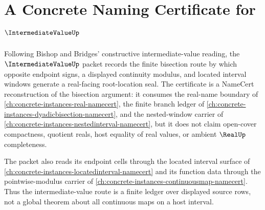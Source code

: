 \chapter{A Concrete Naming Certificate for $\IntermediateValueUp$}
\label{ch:concrete-instances-intermediatevalue-namecert}

Following Bishop and Bridges' constructive intermediate-value reading, the $\IntermediateValueUp$ packet records the finite bisection route by which opposite endpoint signs, a displayed continuity modulus, and located interval windows generate a real-facing root-location seal. The certificate is a NameCert reconstruction of the bisection argument: it consumes the real-name boundary of \autoref{ch:concrete-instances-real-namecert}, the finite branch ledger of \autoref{ch:concrete-instances-dyadicbisection-namecert}, and the nested-window carrier of \autoref{ch:concrete-instances-nestedinterval-namecert}, but it does not claim open-cover compactness, quotient reals, host equality of real values, or ambient $\RealUp$ completeness.

The packet also reads its endpoint cells through the located interval surface of \autoref{ch:concrete-instances-locatedinterval-namecert} and its function data through the pointwise-modulus carrier of \autoref{ch:concrete-instances-continuousmap-namecert}. Thus the intermediate-value route is a finite ledger over displayed source rows, not a global theorem about all continuous maps on a host interval.

